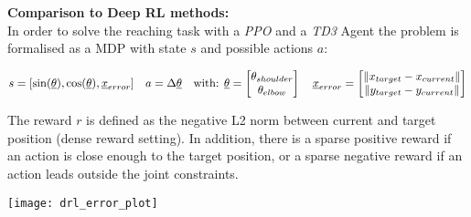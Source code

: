 \documentclass[portrait,final,a0paper,fontscale=0.39]{baposter}
\begin{document}
\begin{poster}
{\begin{adjustbox}{minipage=0.95\textwidth, margin=5pt, center}
\begin{minipage}[t]{0.25\textwidth}
\begin{center}
			\end{center}
		\end{minipage}
		\hfill
		\begin{minipage}[t]{0.725\textwidth}
			\vspace{8pt}
			\textbf{Comparison to Deep RL methods:}\\[2pt]
			In order to solve the reaching task with a \textit{PPO} \parencite{schulmanProximalPolicyOptimization2017} and a \textit{TD3} Agent \parencite{fujimoto2018addressing} the problem is formalised as a MDP with state $s$ and possible actions $a$:\\[-8pt]
			\begin{center}
				$s = [\sin(\underline{\theta}),  \cos(\underline{\theta}), \underline{x}_{error}] \hspace{10pt} a = \Delta\underline{\theta}\hspace{10pt} \text{with:  } \underline{\theta}=\begin{bmatrix}
					\theta_{shoulder} \\
					\theta_{elbow} \\ 
				\end{bmatrix} \hspace{10pt} 
				\underline{x}_{error}=\begin{bmatrix}
					\left\lVert x_{target} - x_{current} \right\rVert \\
					\left\lVert y_{target} - y_{current} \right\rVert \\ 
				\end{bmatrix}  \vspace{5pt}
				$
			\end{center}
			The reward $r$ is defined as the negative L2 norm between current and target position (dense reward setting). In addition, there is a sparse positive reward if an action is close enough to the target position, or a sparse negative reward if an action leads outside the joint constraints.\\[5pt]
			\begin{center}
				\texttt{[image: drl\_error\_plot]}
			\end{center}
		\end{minipage}
		\hfill
	\end{adjustbox}

}


\end{poster}
\end{document}
